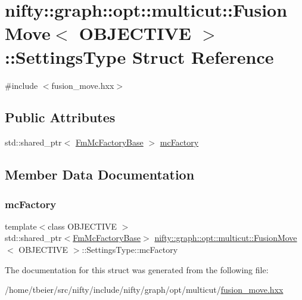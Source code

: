 \hypertarget{structnifty_1_1graph_1_1opt_1_1multicut_1_1FusionMove_1_1SettingsType}{}\section{nifty\+:\+:graph\+:\+:opt\+:\+:multicut\+:\+:Fusion\+Move$<$ O\+B\+J\+E\+C\+T\+I\+VE $>$\+:\+:Settings\+Type Struct Reference}
\label{structnifty_1_1graph_1_1opt_1_1multicut_1_1FusionMove_1_1SettingsType}


{\ttfamily \#include $<$fusion\+\_\+move.\+hxx$>$}

\subsection*{Public Attributes}
\begin{DoxyCompactItemize}
\item 
std\+::shared\+\_\+ptr$<$ \hyperlink{classnifty_1_1graph_1_1opt_1_1multicut_1_1FusionMove_a45f5161fca8c8c92187acd749dd13662}{Fm\+Mc\+Factory\+Base} $>$ \hyperlink{structnifty_1_1graph_1_1opt_1_1multicut_1_1FusionMove_1_1SettingsType_ad8cfc930b908335c854ab90b58a852c3}{mc\+Factory}
\end{DoxyCompactItemize}


\subsection{Member Data Documentation}
\mbox{\label{structnifty_1_1graph_1_1opt_1_1multicut_1_1FusionMove_1_1SettingsType_ad8cfc930b908335c854ab90b58a852c3}} 
\subsubsection{\texorpdfstring{mc\+Factory}{mcFactory}}
{\footnotesize\ttfamily template$<$class O\+B\+J\+E\+C\+T\+I\+VE $>$ \\
std\+::shared\+\_\+ptr$<$\hyperlink{classnifty_1_1graph_1_1opt_1_1multicut_1_1FusionMove_a45f5161fca8c8c92187acd749dd13662}{Fm\+Mc\+Factory\+Base}$>$ \hyperlink{classnifty_1_1graph_1_1opt_1_1multicut_1_1FusionMove}{nifty\+::graph\+::opt\+::multicut\+::\+Fusion\+Move}$<$ O\+B\+J\+E\+C\+T\+I\+VE $>$\+::Settings\+Type\+::mc\+Factory}



The documentation for this struct was generated from the following file\+:\begin{DoxyCompactItemize}
\item 
/home/tbeier/src/nifty/include/nifty/graph/opt/multicut/\hyperlink{multicut_2fusion__move_8hxx}{fusion\+\_\+move.\+hxx}\end{DoxyCompactItemize}

